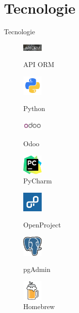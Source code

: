 \documentclass{beamer}
\begin{document}
\section{Tecnologie}
\begin{frame}{Tecnologie}
\vspace*{0.5cm}
\begin{minipage}[c]{0.3\textwidth}
	\begin{figure}
		\centering
		\vspace*{0.5cm}
		\includegraphics[width=1cm]{figures/orm}
		\caption{API ORM}
		
		\includegraphics[width=1cm]{figures/python}
		\caption{Python}
		\includegraphics[width=1cm]{figures/logo_odoo}
		\caption{Odoo}
		\includegraphics[width=1cm]{figures/Logo_PyCharm}
		\caption{PyCharm}
	\end{figure}
\end{minipage}
\hfill
\begin{minipage}[c]{0.6\textwidth}
	\begin{figure}
		\centering
		\includegraphics[width=1cm]{figures/openproject}
		\caption{OpenProject}

		\includegraphics[width=1cm]{figures/Logo_Postgresql}
		\caption{pgAdmin}

		\includegraphics[width=1cm]{figures/homebrew}
		\caption{Homebrew}

	\end{figure}
\end{minipage}		
\end{frame}
\end{document}
